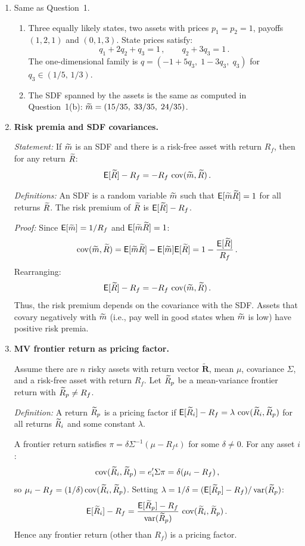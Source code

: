 \begin{enumerate}
\item Same as Question~1.

\begin{enumerate}
\item[(a)] Three equally likely states, two assets with prices $p_1=p_2=1$, payoffs $(1,2,1)$ and $(0,1,3)$.  State prices satisfy:
\[
q_1+2q_2+q_3=1\,,\qquad q_2+3q_3=1\,.
\]
The one-dimensional family is $q = (-1+5q_3,\;1-3q_3,\;q_3)$ for $q_3 \in (1/5,\,1/3)$.

\item[(b)] The SDF spanned by the assets is the same as computed in Question~1(b): $\widetilde{m} = (15/35,\;33/35,\;24/35)$.
\end{enumerate}

\item \textbf{Risk premia and SDF covariances.}

\textit{Statement:} If $\widetilde{m}$ is an SDF and there is a risk-free asset with return $R_f$, then for any return $\widetilde{R}$:
\[
\mathsf{E}[\widetilde{R}]-R_f = -R_f\,\operatorname{cov}(\widetilde{m},\widetilde{R})\,.
\]

\textit{Definitions:} An SDF is a random variable $\widetilde{m}$ such that $\mathsf{E}[\widetilde{m}\widetilde{R}]=1$ for all returns $\widetilde{R}$.  The risk premium of $\widetilde{R}$ is $\mathsf{E}[\widetilde{R}]-R_f$.

\textit{Proof:} Since $\mathsf{E}[\widetilde{m}]=1/R_f$ and $\mathsf{E}[\widetilde{m}\widetilde{R}]=1$:
\[
\operatorname{cov}(\widetilde{m},\widetilde{R}) = \mathsf{E}[\widetilde{m}\widetilde{R}]-\mathsf{E}[\widetilde{m}]\mathsf{E}[\widetilde{R}] = 1-\frac{\mathsf{E}[\widetilde{R}]}{R_f}\,.
\]
Rearranging:
\[
\mathsf{E}[\widetilde{R}]-R_f = -R_f\,\operatorname{cov}(\widetilde{m},\widetilde{R})\,.
\]
Thus, the risk premium depends on the covariance with the SDF.  Assets that covary negatively with $\widetilde{m}$ (i.e., pay well in good states when $\widetilde{m}$ is low) have positive risk premia.

\item \textbf{MV frontier return as pricing factor.}

Assume there are $n$ risky assets with return vector $\tilde{\mathbf{R}}$, mean $\mu$, covariance $\Sigma$, and a risk-free asset with return $R_f$.  Let $\widetilde{R}_p$ be a mean-variance frontier return with $\widetilde{R}_p \neq R_f$.

\textit{Definition:} A return $\widetilde{R}_p$ is a pricing factor if $\mathsf{E}[\widetilde{R}_i]-R_f = \lambda\,\operatorname{cov}(\widetilde{R}_i,\widetilde{R}_p)$ for all returns $\widetilde{R}_i$ and some constant $\lambda$.

A frontier return satisfies $\pi = \delta\Sigma^{-1}(\mu-R_f\iota)$ for some $\delta\neq 0$.  For any asset $i$:
\[
\operatorname{cov}(\widetilde{R}_i,\widetilde{R}_p) = e_i'\Sigma\pi = \delta(\mu_i-R_f)\,,
\]
so $\mu_i - R_f = (1/\delta)\operatorname{cov}(\widetilde{R}_i,\widetilde{R}_p)$.  Setting $\lambda = 1/\delta = (\mathsf{E}[\widetilde{R}_p]-R_f)/\operatorname{var}(\widetilde{R}_p)$:
\[
\mathsf{E}[\widetilde{R}_i]-R_f = \frac{\mathsf{E}[\widetilde{R}_p]-R_f}{\operatorname{var}(\widetilde{R}_p)}\,\operatorname{cov}(\widetilde{R}_i,\widetilde{R}_p)\,.
\]
Hence any frontier return (other than $R_f$) is a pricing factor.


\end{enumerate}
